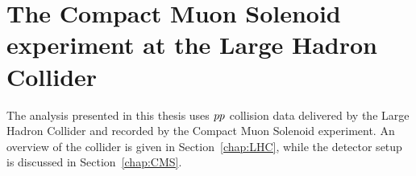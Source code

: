 \chapter[The CMS experiment at the LHC]{The Compact Muon Solenoid experiment at the Large Hadron
Collider \label{chap:LHC_CMS}}

The analysis presented in this thesis uses ${p}{p}$ collision data delivered by the Large Hadron
Collider and recorded by the Compact Muon Solenoid experiment. An overview of the collider is
given in Section~\ref{chap:LHC}, while the detector setup is discussed in Section~\ref{chap:CMS}.



